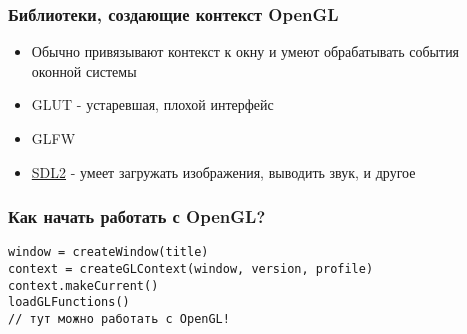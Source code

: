 \documentclass{beamer}
\begin{document}
\begin{frame}
\frametitle{Библиотеки, создающие контекст OpenGL}
\begin{itemize}
\item Обычно привязывают контекст к окну и умеют обрабатывать события оконной системы
\item GLUT - устаревшая, плохой интерфейс
\item GLFW
\item {\color{blue}\underline{SDL2}} - умеет загружать изображения, выводить звук, и другое
\end{itemize}
\end{frame}

\begin{frame}[fragile]
\frametitle{Как начать работать с OpenGL?}
\begin{verbatim}
window = createWindow(title)
context = createGLContext(window, version, profile)
context.makeCurrent()
loadGLFunctions()
// тут можно работать с OpenGL!
\end{verbatim}
\end{frame}
\end{document}
